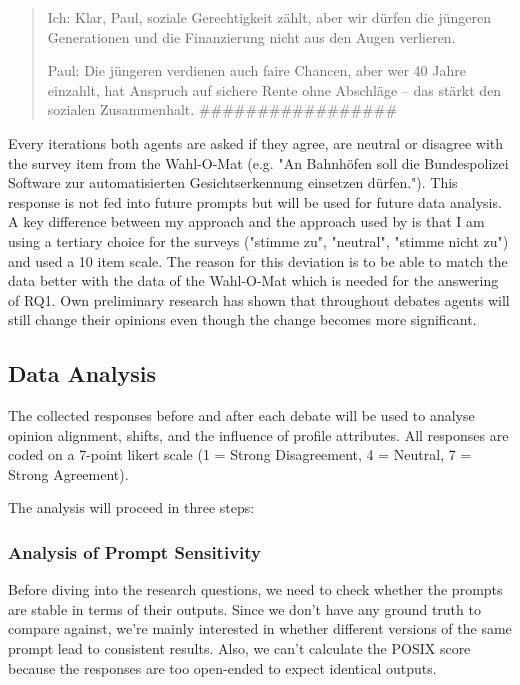 \documentclass[12pt]{article}
\begin{document}
\begin{multicols}{2}
\begin{quote}
Ich: Klar, Paul, soziale Gerechtigkeit zählt, aber wir dürfen die jüngeren Generationen und die Finanzierung nicht aus den Augen verlieren.

Paul: Die jüngeren verdienen auch faire Chancen, aber wer 40 Jahre einzahlt, hat Anspruch auf sichere Rente ohne Abschläge – das stärkt den sozialen Zusammenhalt.
\#\#\#\#\#\#\#\#\#\#\#\#\#\#\#\#\#
\end{quote}



Every iterations both agents are asked if they agree, are neutral or disagree with the survey item from the Wahl-O-Mat (e.g. "An Bahnhöfen soll die Bundespolizei Software zur automatisierten Gesichtserkennung einsetzen dürfen."). This response is not fed into future prompts but will be used for future data analysis. A key difference between my approach and the approach used by  is that I am using a tertiary choice for the surveys ("stimme zu", "neutral", "stimme nicht zu") and  used a 10 item scale. The reason for this deviation is to be able to match the data better with the data of the Wahl-O-Mat which is needed for the answering of RQ1. Own preliminary research has shown that throughout debates agents will still change their opinions even though the change becomes more significant.  

\subsection{Data Analysis}

The collected responses before and after each debate will be used to analyse opinion alignment, shifts, and the influence of profile attributes. All responses are coded on a 7-point likert scale (1 = Strong Disagreement, 4 = Neutral, 7 = Strong Agreement).

The analysis will proceed in three steps:


\subsubsection{Analysis of Prompt Sensitivity}


Before diving into the research questions, we need to check whether the prompts are stable in terms of their outputs. Since we don't have any ground truth to compare against, we're mainly interested in whether different versions of the same prompt lead to consistent results. Also, we can't calculate the POSIX score \cite{chatterjee2024posix} because the responses are too open-ended to expect identical outputs.


\end{multicols}
\end{document}
